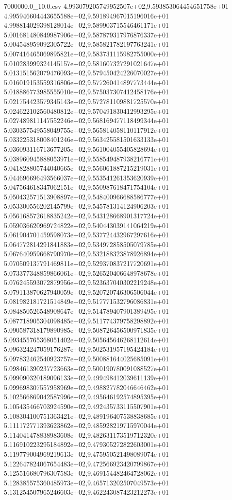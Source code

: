 \begin{filecontents*}{7000000.0_10.0.csv}
4.993079205749952507e+02,9.593853064454651758e+01
4.995946604443655588e+02,9.591894967015196016e+01
4.998814029398128014e+02,9.589903715546461171e+01
5.001681480849987906e+02,9.587879317976876337e+01
5.004548959092305722e+02,9.585821782197763241e+01
5.007416465069895821e+02,9.583731115982755000e+01
5.010283999324145157e+02,9.581607327291021647e+01
5.013151562079476093e+02,9.579450424226070027e+01
5.016019153559316806e+02,9.577260414897773444e+01
5.018886773985555010e+02,9.575037307412458176e+01
5.021754423579345143e+02,9.572781109881725570e+01
5.024622102560480812e+02,9.570491830412993295e+01
5.027489811147552246e+02,9.568169477118499344e+01
5.030357549558049755e+02,9.565814058110117912e+01
5.033225318008401246e+02,9.563425581501633133e+01
5.036093116713677205e+02,9.561004055405828694e+01
5.038960945888053971e+02,9.558549487938216771e+01
5.041828805744040665e+02,9.556061887215219031e+01
5.044696696493566037e+02,9.553541261353620939e+01
5.047564618347062151e+02,9.550987618471754104e+01
5.050432571513908897e+02,9.548400966688586777e+01
5.053300556202145799e+02,9.545781314124906203e+01
5.056168572618835242e+02,9.543128668901317724e+01
5.059036620969724822e+02,9.540443039141064219e+01
5.061904701459598073e+02,9.537724432967297616e+01
5.064772814291841883e+02,9.534972858505079785e+01
5.067640959668790970e+02,9.532188323878926894e+01
5.070509137791469811e+02,9.529370837217720691e+01
5.073377348859866061e+02,9.526520406648978678e+01
5.076245593072879956e+02,9.523637040302219248e+01
5.079113870627940059e+02,9.520720746306506044e+01
5.081982181721514849e+02,9.517771532796086831e+01
5.084850526548908647e+02,9.514789407901389495e+01
5.087718905304098485e+02,9.511774379758298892e+01
5.090587318179890985e+02,9.508726456500971835e+01
5.093455765368051402e+02,9.505645646268112614e+01
5.096324247059176287e+02,9.502531957195424184e+01
5.097832462540923757e+02,9.500881644025685091e+01
5.098461390237723663e+02,9.500190780091088527e+01
5.099090320189096133e+02,9.499498412039611139e+01
5.099698307557958969e+02,9.498827782046646462e+01
5.102566869042587996e+02,9.495646192574895395e+01
5.105435466703924590e+02,9.492435733115507901e+01
5.108304100751363421e+02,9.489196407538838685e+01
5.111172771393623862e+02,9.485928219715970044e+01
5.114041478838983608e+02,9.482631173519712320e+01
5.116910223295184892e+02,9.479305272822603001e+01
5.119779004969219613e+02,9.475950521498089074e+01
5.122647824067654483e+02,9.472566923420799867e+01
5.125516680796307583e+02,9.469154482464728062e+01
5.128385575360485973e+02,9.465713202507049573e+01
5.131254507965246603e+02,9.462243087423212273e+01

\end{filecontents*}
